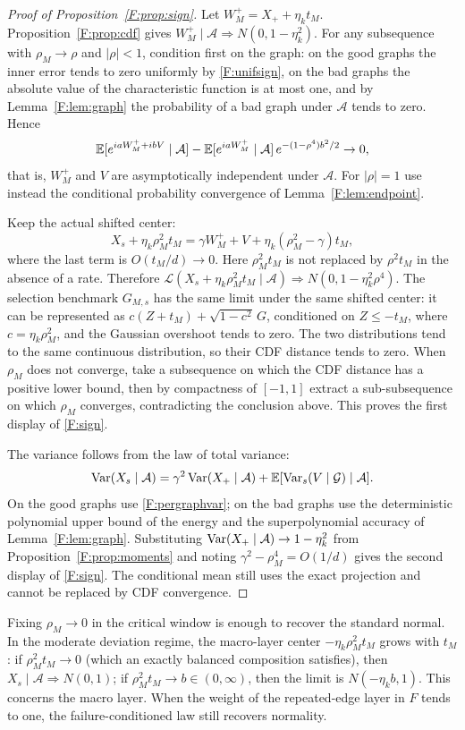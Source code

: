 \begin{proof}[Proof of Proposition~\ref{F:prop:sign}]
Let $W^+_M=X_++\eta_kt_M$. Proposition~\ref{F:prop:cdf} gives
$W^+_M\mid \mathcal A\Rightarrow N(0,1-\eta_k^2)$. For any subsequence with $\rho_M\to\rho$ and
$|\rho|<1$, condition first on the graph: on the good graphs the inner error tends to zero
uniformly by \eqref{F:unifsign}, on the bad graphs the absolute value of the characteristic
function is at most one, and by Lemma~\ref{F:lem:graph} the probability of a bad graph under
$\mathcal A$ tends to zero. Hence
\[
\mathbb E[e^{iaW^+_M+ibV}\mid \mathcal A]-\mathbb E[e^{iaW^+_M}\mid \mathcal A]\,e^{-(1-\rho^4)b^2/2}\to0,
\]
that is, $W^+_M$ and $V$ are asymptotically independent under $\mathcal A$. For $|\rho|=1$ use
instead the conditional probability convergence of Lemma~\ref{F:lem:endpoint}.

Keep the actual shifted center:
\[
X_s+\eta_k\rho_M^2t_M=\gamma W^+_M+V+\eta_k(\rho_M^2-\gamma)t_M,
\]
where the last term is $O(t_M/d)\to0$. Here $\rho_M^2t_M$ is not replaced by $\rho^2t_M$ in the
absence of a rate. Therefore
$\mathcal L(X_s+\eta_k\rho_M^2t_M\mid \mathcal A)\Rightarrow N(0,1-\eta_k^2\rho^4)$. The
selection benchmark $G_{M,s}$ has the same limit under the same shifted center: it can be
represented as $c(Z+t_M)+\sqrt{1-c^2}\,G$, conditioned on $Z\le-t_M$, where $c=\eta_k\rho_M^2$,
and the Gaussian overshoot tends to zero. The two distributions tend to the same continuous
distribution, so their CDF distance tends to zero. When $\rho_M$ does not converge, take a
subsequence on which the CDF distance has a positive lower bound, then by compactness of $[-1,1]$
extract a sub-subsequence on which $\rho_M$ converges, contradicting the conclusion above. This
proves the first display of \eqref{F:sign}.

The variance follows from the law of total variance:
\[
\operatorname{Var}(X_s\mid \mathcal A)=\gamma^2\operatorname{Var}(X_+\mid \mathcal A)+\mathbb E[\operatorname{Var}_s(V\mid\mathcal G)\mid \mathcal A].
\]
On the good graphs use \eqref{F:pergraphvar}; on the bad graphs use the deterministic polynomial
upper bound of the energy and the superpolynomial accuracy of Lemma~\ref{F:lem:graph}. Substituting
$\operatorname{Var}(X_+\mid \mathcal A)\to1-\eta_k^2$ from Proposition~\ref{F:prop:moments} and noting
$\gamma^2-\rho_M^4=O(1/d)$ gives the second display of \eqref{F:sign}. The conditional mean still
uses the exact projection and cannot be replaced by CDF convergence.
\end{proof}

\begin{remark}
Fixing $\rho_M\to0$ in the critical window is enough to recover the standard normal. In the
moderate deviation regime, the macro-layer center $-\eta_k\rho_M^2t_M$ grows with $t_M$: if
$\rho_M^2t_M\to0$ (which an exactly balanced composition satisfies), then
$X_s\mid \mathcal A\Rightarrow N(0,1)$; if $\rho_M^2t_M\to b\in(0,\infty)$, then the limit is
$N(-\eta_kb,1)$. This concerns the macro layer. When the weight of the repeated-edge layer in $F$
tends to one, the failure-conditioned law still recovers normality.
\end{remark}

